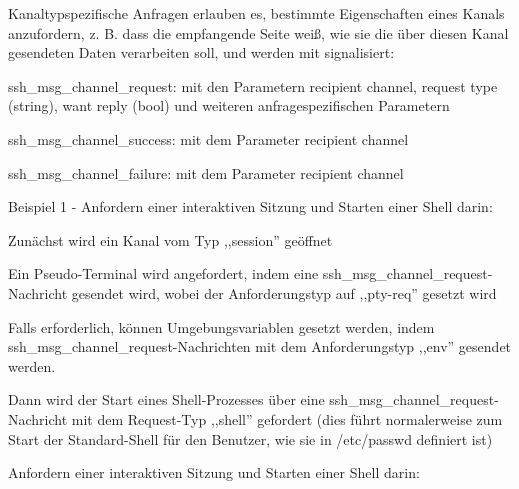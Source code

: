 \documentclass[a4paper]{article}
\begin{document}
\begin{multicols}{3}
\begin{itemize*}
\begin{itemize*}
            \end{itemize*}
            \item Kanaltypspezifische Anfragen erlauben es, bestimmte Eigenschaften eines Kanals anzufordern, z. B. dass die empfangende Seite weiß, wie sie die über diesen Kanal gesendeten Daten verarbeiten soll, und werden mit signalisiert:
            \begin{itemize*}
                  \item ssh\_msg\_channel\_request: mit den Parametern recipient channel, request type (string), want reply (bool) und weiteren anfragespezifischen Parametern
                  \item ssh\_msg\_channel\_success: mit dem Parameter recipient channel
                  \item ssh\_msg\_channel\_failure: mit dem Parameter recipient channel
            \end{itemize*}
            \item Beispiel 1 - Anfordern einer interaktiven Sitzung und Starten einer Shell darin:
            \begin{itemize*}
                  \item Zunächst wird ein Kanal vom Typ ,,session'' geöffnet
                  \item Ein Pseudo-Terminal wird angefordert, indem eine ssh\_msg\_channel\_request-Nachricht gesendet wird, wobei der Anforderungstyp auf ,,pty-req'' gesetzt wird
                  \item Falls erforderlich, können Umgebungsvariablen gesetzt werden, indem ssh\_msg\_channel\_request-Nachrichten mit dem Anforderungstyp ,,env'' gesendet werden.
                  \item Dann wird der Start eines Shell-Prozesses über eine ssh\_msg\_channel\_request-Nachricht mit dem Request-Typ ,,shell'' gefordert (dies führt normalerweise zum Start der Standard-Shell für den Benutzer, wie sie in /etc/passwd definiert ist)
                  \item Anfordern einer interaktiven Sitzung und Starten einer Shell darin:

            \end{itemize*}
      \end{itemize*}


\end{multicols}
\end{document}
